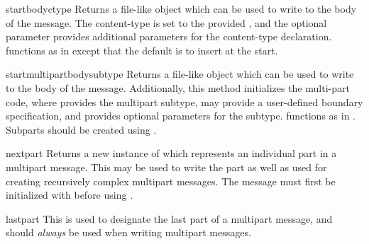 \begin{methoddesc}{startbody}{ctype}
Returns a file-like object which can be used to write to the
body of the message.  The content-type is set to the provided
, and the optional parameter  provides
additional parameters for the content-type declaration. 
functions as in  except that the default is to
insert at the start.
\end{methoddesc}

\begin{methoddesc}{startmultipartbody}{subtype}
Returns a file-like object which can be used to write to the
body of the message.  Additionally, this method initializes the
multi-part code, where  provides the multipart subtype,
 may provide a user-defined boundary specification, and
 provides optional parameters for the subtype.
 functions as in .  Subparts should be
created using .
\end{methoddesc}

\begin{methoddesc}{nextpart}{}
Returns a new instance of  which represents an
individual part in a multipart message.  This may be used to write the 
part as well as used for creating recursively complex multipart
messages. The message must first be initialized with
 before using .
\end{methoddesc}

\begin{methoddesc}{lastpart}{}
This is used to designate the last part of a multipart message, and
should \emph{always} be used when writing multipart messages.
\end{methoddesc}
